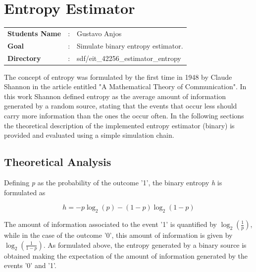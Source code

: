 \clearpage
\section{Entropy Estimator}

\begin{refsection}

\begin{tcolorbox}	
\begin{tabular}{p{2.75cm} p{0.2cm} p{10.5cm}} 	
\textbf{Students Name} &:& Gustavo Anjos \\
\textbf{Goal}          &:& Simulate binary entropy estimator.\\
\textbf{Directory}     &:& sdf/eit\_42256\_estimator\_entropy
\end{tabular}
\end{tcolorbox}

The concept of entropy was formulated by the first time in 1948 by Claude Shannon in the article entitled
"A Mathematical Theory of Communication". In this work Shannon defined entropy as the average amount of
information generated by a random source, stating that the events that occur less should carry more information
than the ones the occur often.
In the following sections the theoretical description of the implemented entropy estimator (binary) is provided
and evaluated using a simple simulation chain. 

\subsection{Theoretical Analysis}

Defining \textit{p} as the probability of the outcome '1', the binary entropy \textit{h} is formulated as 

\begin{equation}
h = -p\log_2(p) - (1-p)\log_2(1-p)
\end{equation}

The amount of information associated to the event '1' is quantified by $\log_2({\frac{1}{p}})$, while in the case of the
outcome '0', this amount of information is given by $\log_2({\frac{1}{1-p}})$. As formulated above, the entropy generated 
by a binary source is obtained making the expectation of the amount of information generated by the events '0' and '1'.
      
\begin{figure}[h]

\end{figure}
\end{refsection}

